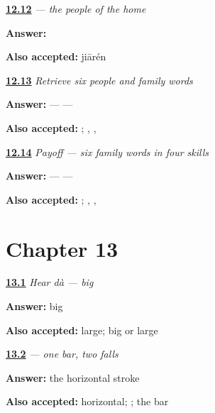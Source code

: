 \noindent\begin{minipage}[t]{\linewidth}
\raggedright
\hyperlink{review-ZH-C12-jiaren-write}{\textbf{12.12}} \emph{ — the people of the home}\par
\small \textbf{Answer:} \par
\footnotesize \textbf{Also accepted:}  jiārén
\end{minipage}\par\medskip

\noindent\begin{minipage}[t]{\linewidth}
\raggedright
\hyperlink{review-ZH-R12-family-six-recall}{\textbf{12.13}} \emph{Retrieve six people and family words}\par
\small \textbf{Answer:}  —  — \par
\footnotesize \textbf{Also accepted:}   ; , , 
\end{minipage}\par\medskip

\noindent\begin{minipage}[t]{\linewidth}
\raggedright
\hyperlink{review-ZH-C12-practice-family-payoff}{\textbf{12.14}} \emph{Payoff — six family words in four skills}\par
\small \textbf{Answer:}  —  — \par
\footnotesize \textbf{Also accepted:}   ; , , 
\end{minipage}\par\medskip

\section*{Chapter 13}

\noindent\begin{minipage}[t]{\linewidth}
\raggedright
\hyperlink{review-ZH-C13-hear-da-meaning}{\textbf{13.1}} \emph{Hear \emph{dà} — big}\par
\small \textbf{Answer:} big\par
\footnotesize \textbf{Also accepted:} large; big or large
\end{minipage}\par\medskip

\noindent\begin{minipage}[t]{\linewidth}
\raggedright
\hyperlink{review-ZH-W13-da-order}{\textbf{13.2}} \emph{ — one bar, two falls}\par
\small \textbf{Answer:} the horizontal stroke\par
\footnotesize \textbf{Also accepted:} horizontal; ; the bar
\end{minipage}\par\medskip

